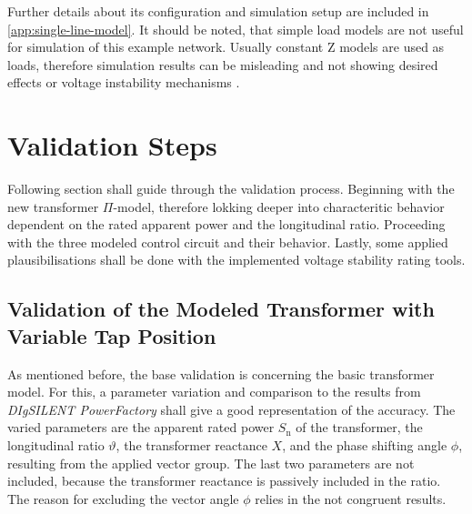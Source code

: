 Further details about its configuration and simulation setup are included in \autoref{app:single-line-model}. 
It should be noted, that simple load models are not useful for simulation of this example network. 
Usually constant Z models are used as loads, therefore simulation results can be misleading and not showing desired effects or voltage instability mechanisms \quelle. 



\section{Validation Steps}

Following section shall guide through the validation process.
Beginning with the new transformer $\Pi$-model, therefore lokking deeper into characteritic behavior dependent on the rated apparent power and the longitudinal ratio.
Proceeding with the three modeled control circuit and their behavior.
Lastly, some applied plausibilisations shall be done with the implemented voltage stability rating tools.

\subsection{Validation of the Modeled Transformer with Variable Tap Position}

As mentioned before, the base validation is concerning the basic transformer model.
For this, a parameter variation and comparison to the results from \textit{DIgSILENT PowerFactory} shall give a good representation of the accuracy.
The varied parameters are the apparent rated power $S_\mathrm{n}$ of the transformer, the longitudinal ratio $\vartheta$, the transformer reactance $X$, and the phase shifting angle $\phi$, resulting from the applied vector group.
The last two parameters are not included, because the transformer reactance is passively included in the ratio.
The reason for excluding the vector angle $\phi$ relies in the not congruent results.

